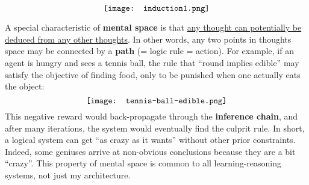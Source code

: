 \begin{preview}
\begin{minipage}{\textwidth}

\setcounter{mpfootnote}{1}
\begin{equation}
\vcenter{\hbox{\texttt{[image: induction1.png]}}}
\end{equation}

A special characteristic of \textbf{mental space} is that \uline{any thought can potentially be deduced from any other thoughts}.  In other words, any two points in thoughts space may be connected by a \textbf{path} (= logic rule = action).  For example, if an agent is hungry and sees a tennis ball, the rule that ``round implies edible'' may satisfy the objective of finding food, only to be punished when one actually eats the object:
\begin{equation}
\vcenter{\hbox{\texttt{[image: tennis-ball-edible.png]}}}
\end{equation}
This negative reward would back-propagate through the \textbf{inference chain}, and after many iterations, the system would eventually find the culprit rule.  In short, a logical system can get ``as crazy as it wants'' without other prior constraints.  Indeed, some geniuses arrive at non-obvious conclusions because they are a bit ``crazy''.  This property of mental space is common to all learning-reasoning systems, not just my architecture.

\end{minipage}
\end{preview}

